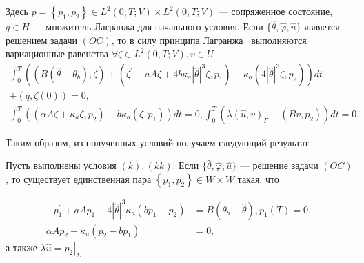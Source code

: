 Здесь $p=\left\{p_{1}, p_{2}\right\} \in L^{2}(0, T; V) \times L^{2}(0, T; V) $
— сопряженное состояние, $q \in H$ — множитель Лагранжа для начального условия.
Если $\{\widehat{\theta}, \widehat{\varphi}, \widehat{u}\}$
является решением задачи $(OC)$, то в силу принципа
Лагранжа~\cite[гл. 2, теорема 1.5]{10} выполняются вариационные равенства
$\forall \zeta \in L^{2}(0, T ; V), v \in U$
\[
    \begin{gathered}
        \int_{0}^{T}\left(\left(B\left(\widehat{\theta}-\theta_{b}\right),
        \zeta\right)+\left(\zeta^{\prime}
        +a A \zeta+4 b \kappa_{a}|\widehat{\theta}|^{3} \zeta, p_{1}\right)
        - \kappa_{a}\left(4|\widehat{\theta}|^{3} \zeta,
        p_{2}\right)\right) d t \\
        +(q, \zeta(0))=0, \\
        \int_{0}^{T}\left(\left(\alpha A \zeta
        +\kappa_{a} \zeta, p_{2}\right)
        -b \kappa_{a}\left(\zeta, p_{1}\right)\right) d t=0,
        \int_{0}^{T}\left(\lambda(\widehat{u}, v)_{\Gamma}
        -\left(B v, p_{2}\right)\right) d t=0.
    \end{gathered}
\]

Таким образом, из полученных условий получаем следующий результат.

\begin{theorem}
    \label{th:2_3:2}
    Пусть выполнены условия $(k), (kk)$.
    Если $\{\widehat{\theta}, \widehat{\varphi}, \widehat{u}\}$ — решение задачи $(OC)$,
    то существует единственная пара $\left\{p_ {1}, p_{2}\right\} \in W \times W$ такая, что

    \begin{equation}
        \label{eq:2_3:15}
        \begin{aligned}
            -p_{1}^{\prime}+a A p_{1}+4|\widehat{\theta}|^{3} \kappa_{a}\left(b p_{1}
            -p_{2}\right)&=B\left(\theta_{b}-\widehat{\theta}\right),
            p_{1}(T)=0, \\
            \alpha A p_{2}+\kappa_{a}\left(p_{2}-b p_{1}\right)&=0,
        \end{aligned}
    \end{equation}
    а также $\lambda \widehat{u}=\left.p_{2}\right|_{\Sigma}$.
\end{theorem}


